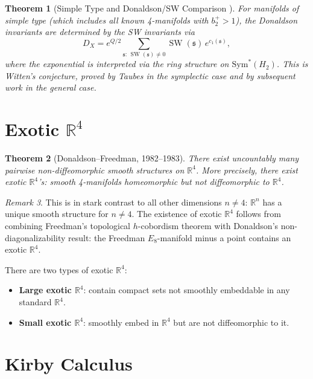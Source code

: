 \documentclass[12pt,a4paper]{amsart}
\newtheorem{theorem}{Theorem}[section]
\theoremstyle{definition}
\theoremstyle{remark}
\newtheorem{remark}[theorem]{Remark}
\DeclareMathOperator{\SW}{SW}
\newcommand{\RR}{\mathbb{R}}
\begin{document}
\begin{theorem}[Simple Type and Donaldson/SW Comparison \cite{Witten1994SW}]
For manifolds of \emph{simple type} (which includes all known 4-manifolds
with $b_2^+ > 1$), the Donaldson invariants are determined by the SW
invariants via
\[
  D_X = e^{Q/2} \sum_{\mathfrak{s}:\,\SW(\mathfrak{s})\neq 0} \SW(\mathfrak{s})\,
        e^{c_1(\mathfrak{s})},
\]
where the exponential is interpreted via the ring structure on
$\mathrm{Sym}^*(H_2)$.  This is \emph{Witten's conjecture}, proved by
Taubes in the symplectic case \cite{Taubes1994} and by subsequent work in
the general case.
\end{theorem}

\section{Exotic $\RR^4$}

\begin{theorem}[Donaldson--Freedman, 1982--1983]
There exist uncountably many pairwise non-diffeomorphic smooth structures on
$\RR^4$.  More precisely, there exist \emph{exotic} $\RR^4$'s: smooth
4-manifolds homeomorphic but not diffeomorphic to $\RR^4$.
\end{theorem}

\begin{remark}
This is in stark contrast to all other dimensions $n \neq 4$: $\RR^n$ has a
unique smooth structure for $n \neq 4$.  The existence of exotic $\RR^4$
follows from combining Freedman's topological $h$-cobordism theorem with
Donaldson's non-diagonalizability result: the Freedman $E_8$-manifold minus
a point contains an exotic $\RR^4$.
\end{remark}

There are two types of exotic $\RR^4$:
\begin{itemize}
  \item \textbf{Large exotic $\RR^4$}: contain compact sets not smoothly
        embeddable in any standard $\RR^4$.
  \item \textbf{Small exotic $\RR^4$}: smoothly embed in $\RR^4$ but are not
        diffeomorphic to it.
\end{itemize}

\section{Kirby Calculus}
\end{document}

